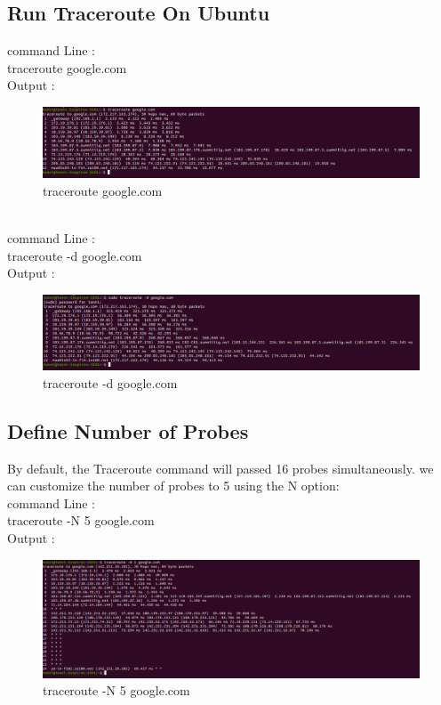 \documentclass[11pt]{article}
\begin{document}
\subsection{Run Traceroute On Ubuntu}
command Line :\\[6pt]
  traceroute google.com\\[12pt]   
        Output : 
  \begin{figure}[!h]
\centering
\includegraphics[width=\textwidth]{trace_google.png}
\caption{traceroute google.com}
\end{figure}
\\[12pt] 
command Line :\\[6pt]
  traceroute -d google.com\\[12pt]   
        Output : 
  \begin{figure}[!h]
\centering
\includegraphics[width=\textwidth]{d_trace_google.png}
\caption{traceroute -d google.com}
\end{figure}

\subsection{Define Number of Probes}
By default, the Traceroute command will passed 16 probes simultaneously. we can customize the number of probes to 5 using the N option:\\[12pt]
command Line :\\[6pt]
  traceroute -N 5 google.com\\[12pt]   
        Output : 
  \begin{figure}[!h]
\centering
\includegraphics[width=\textwidth]{n_trace_google.png}
\caption{traceroute -N 5 google.com}
\end{figure}
\end{document}
